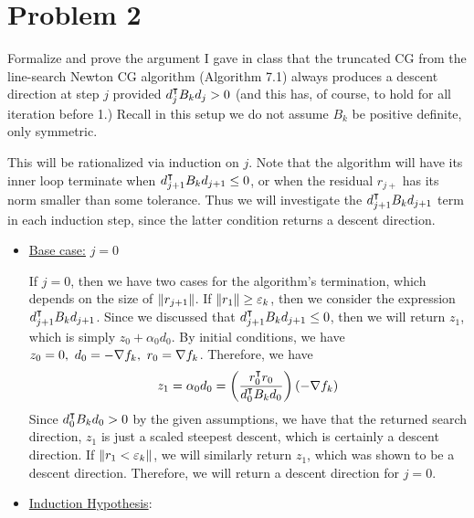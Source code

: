 \section{Problem 2}
Formalize and prove the argument I gave in class that the truncated CG from the line-search Newton CG algorithm (Algorithm 7.1) always produces a descent direction at step $j$ provided $d_j^\intercal B_k d_j > 0$  (and this has, of course, to hold for all iteration before 1.) Recall in this setup we do not assume $B_k$ be positive definite, only symmetric.
\partbreak
\begin{solution}

    This will be rationalized via induction on $j$. Note that the algorithm will have its inner loop terminate when $d_{j+1}^\intercal B_k d_{j+1} \leq 0$, or when the residual $r_{j+}$ has its norm smaller than some tolerance. Thus we will investigate the $d_{j+1}^\intercal B_k d_{j+1}$ term in each induction step, since the latter condition returns a descent direction.
    \begin{itemize}
        \item \underline{Base case:} $j = 0$

        \hop
        If $j = 0$, then we have two cases for the algorithm's termination, which depends on the size of $\norm{r_{j+1}}$. If $\norm{r_1} \geq \varepsilon_k$, then we consider the expression $d_{j+1}^\intercal B_kd_{j+1}$. Since we discussed that $d_{j+1}^\intercal B_kd_{j+1} \leq 0$, then we will return $z_1$, which is simply $z_0 + \alpha_0d_0$. By initial conditions, we have $z_0 = 0, \ d_0 = -\nabla f_k, \ r_0 = \nabla f_k$. Therefore, we have
        \[z_1 = \alpha_0d_0 = \left( \frac{r_0^\intercal r_0}{d_0^\intercal B_k d_0}\right)(-\nabla f_k)\]
        Since $d_0^\intercal B_kd_0 > 0$ by the given assumptions, we have that the returned search direction, $z_1$ is just a scaled steepest descent, which is certainly a descent direction. If $\norm{r_{1} < \varepsilon_k}$, we will similarly return $z_1$, which was shown to be a descent direction. Therefore, we will return a descent direction for $j = 0$.
    
        \item \underline{Induction Hypothesis}: 


\end{itemize}
\end{solution}

